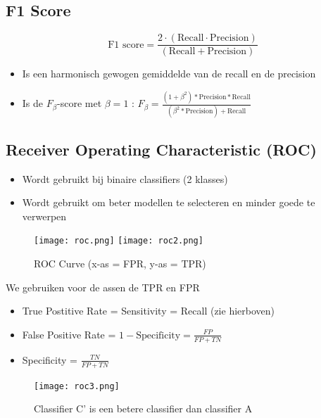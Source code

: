 \documentclass{article}
\begin{document}
\subsection{F1 Score}

\begin{equation}
    \text{F1 score} = \frac{2\cdot(\text{Recall} \cdot \text{Precision})}{(\text{Recall} + \text{Precision})}
\end{equation}

\begin{itemize}
    \item Is een harmonisch gewogen gemiddelde van de recall en de precision
    \item Is de $F_\beta$-score met $\beta = 1$ : $F_{\beta} = \frac{(1+\beta^2)*\text{Precision}*\text{Recall}}{(\beta^2 * \text{Precision}) + \text{Recall}}$
\end{itemize}

\subsection{Receiver Operating Characteristic (ROC)}

\begin{itemize}
    \item Wordt gebruikt bij binaire classifiers (2 klasses)
    \item Wordt gebruikt om beter modellen te selecteren en minder goede te verwerpen
\end{itemize}

\begin{figure}[H]
    \centering
    \texttt{[image: roc.png]}
    \texttt{[image: roc2.png]}
    \caption{ROC Curve (x-as = FPR, y-as = TPR)}
\end{figure}

We gebruiken voor de assen de TPR en FPR

\begin{itemize}
    \item True Postitive Rate = Sensitivity = Recall (zie hierboven)
    \item False Positive Rate = $1 - \text{Specificity} = \frac{FP}{FP + TN}$
    \item Specificity = $\frac{TN}{FP + TN}$
\end{itemize}

\begin{figure}[H]
    \centering
    \texttt{[image: roc3.png]}
    \caption{Classifier C' is een betere classifier dan classifier A}
\end{figure}
\end{document}
